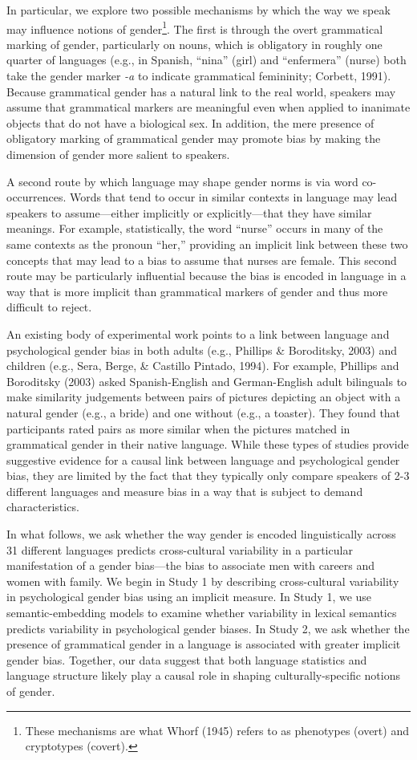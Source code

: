 \documentclass[man,floatsintext]{apa6}
\let\rmarkdownfootnote\footnote%
\def\footnote{\protect\rmarkdownfootnote}
\theoremstyle{definition}
\theoremstyle{definition}
\theoremstyle{definition}
\theoremstyle{remark}
\begin{document}
In particular, we explore two possible mechanisms by which the way we
speak may influence notions of
gender\footnote{These mechanisms are what Whorf (1945) refers to as phenotypes (overt) and cryptotypes (covert).}.
The first is through the overt grammatical marking of gender,
particularly on nouns, which is obligatory in roughly one quarter of
languages (e.g., in Spanish, ``nina'' (girl) and ``enfermera'' (nurse)
both take the gender marker \emph{-a} to indicate grammatical
femininity; Corbett, 1991). Because grammatical gender has a natural
link to the real world, speakers may assume that grammatical markers are
meaningful even when applied to inanimate objects that do not have a
biological sex. In addition, the mere presence of obligatory marking of
grammatical gender may promote bias by making the dimension of gender
more salient to speakers.

A second route by which language may shape gender norms is via word
co-occurrences. Words that tend to occur in similar contexts in language
may lead speakers to assume---either implicitly or explicitly---that
they have similar meanings. For example, statistically, the word
\enquote{nurse} occurs in many of the same contexts as the pronoun
\enquote{her,} providing an implicit link between these two concepts
that may lead to a bias to assume that nurses are female. This second
route may be particularly influential because the bias is encoded in
language in a way that is more implicit than grammatical markers of
gender and thus more difficult to reject.

An existing body of experimental work points to a link between language
and psychological gender bias in both adults (e.g., Phillips \&
Boroditsky, 2003) and children (e.g., Sera, Berge, \& Castillo Pintado,
1994). For example, Phillips and Boroditsky (2003) asked Spanish-English
and German-English adult bilinguals to make similarity judgements
between pairs of pictures depicting an object with a natural gender
(e.g., a bride) and one without (e.g., a toaster). They found that
participants rated pairs as more similar when the pictures matched in
grammatical gender in their native language. While these types of
studies provide suggestive evidence for a causal link between language
and psychological gender bias, they are limited by the fact that they
typically only compare speakers of 2-3 different languages and measure
bias in a way that is subject to demand characteristics.

In what follows, we ask whether the way gender is encoded linguistically
across 31 different languages predicts cross-cultural variability in a
particular manifestation of a gender bias---the bias to associate men
with careers and women with family. We begin in Study 1 by describing
cross-cultural variability in psychological gender bias using an
implicit measure. In Study 1, we use semantic-embedding models to
examine whether variability in lexical semantics predicts variability in
psychological gender biases. In Study 2, we ask whether the presence of
grammatical gender in a language is associated with greater implicit
gender bias. Together, our data suggest that both language statistics
and language structure likely play a causal role in shaping
culturally-specific notions of gender.
\end{document}
